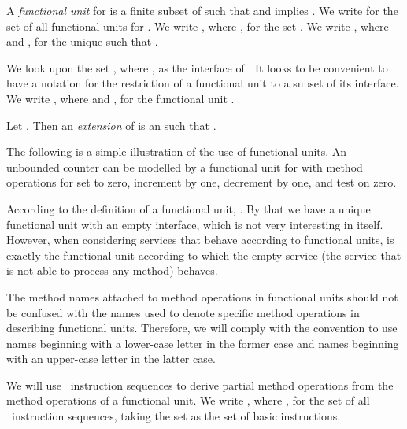 \documentclass[fleqn]{llncs}
\begin{document}
A \emph{functional unit} for  is a finite subset  of
 such that \mbox{} and
 implies .
We write  for the set of all functional units for .
We write , where , for the set
.
We write , where  and , for
the unique  such that .

We look upon the set , where , as the
interface of .
It looks to be convenient to have a notation for the restriction of a
functional unit to a subset of its interface.
We write , where  and
, for the functional unit
.

Let .
Then an \emph{extension} of  is an  such that
.

The following is a simple illustration of the use of functional units.
An unbounded counter can be modelled by a functional unit for 
with method operations for set to zero, increment by one, decrement by
one, and test on zero.

According to the definition of a functional unit,
.
By that we have a unique functional unit with an empty interface, which
is not very interesting in itself.
However, when considering services that behave according to functional
units,  is exactly the functional unit according to which the
empty service  (the service that is not able to process any
method) behaves.

The method names attached to method operations in functional units
should not be confused with the names used to denote specific method
operations in describing functional units.
Therefore, we will comply with the convention to use names beginning
with a lower-case letter in the former case and names beginning with an
upper-case letter in the latter case.

We will use \PGLBbt\ instruction sequences to derive partial method
operations from the method operations of a functional unit.
We write , where , for the set of all \PGLBbt\
instruction sequences, taking the set  as the
set  of basic instructions.
\end{document}
